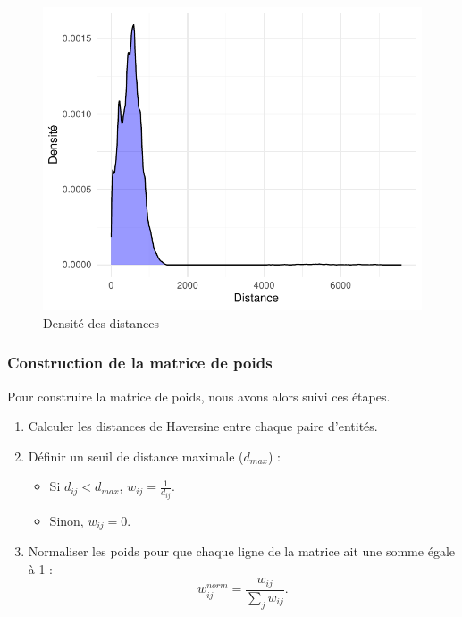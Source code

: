 \documentclass[
]{article}
\providecommand{\tightlist}{%
  \setlength{\itemsep}{0pt}\setlength{\parskip}{0pt}}
\begin{document}
\begin{figure}

{\centering \includegraphics{rapport_intermediaire_files/figure-latex/unnamed-chunk-19-1} 

}

\caption{Densité des distances}\label{fig:unnamed-chunk-19}
\end{figure}

\hypertarget{construction-de-la-matrice-de-poids}{%
\subsubsection{Construction de la matrice de
poids}\label{construction-de-la-matrice-de-poids}}

\hfill\break
Pour construire la matrice de poids, nous avons alors suivi ces
étapes.\\

\begin{enumerate}
\def\labelenumi{\arabic{enumi}.}
\tightlist
\item
  Calculer les distances de Haversine entre chaque paire d'entités.
\item
  Définir un seuil de distance maximale (\(d_{max}\)) :

  \begin{itemize}
  \tightlist
  \item
    Si \(d_{ij} < d_{max}\), \(w_{ij} = \frac{1}{d_{ij}}\).
  \item
    Sinon, \(w_{ij} = 0\).
  \end{itemize}
\item
  Normaliser les poids pour que chaque ligne de la matrice ait une somme
  égale à 1 : \[
   w_{ij}^{norm} = \frac{w_{ij}}{\sum_{j} w_{ij}}.
  \]
\end{enumerate}
\end{document}
